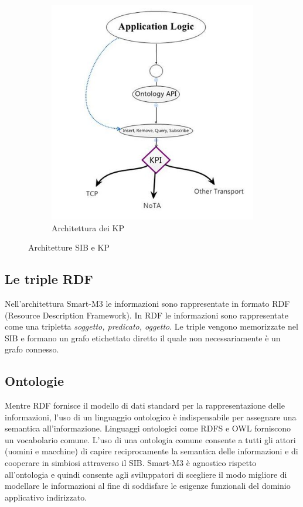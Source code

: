 \begin{figure}[H]
\begin{subfigure}[H]{0.42\textwidth}
                \includegraphics[width=\textwidth]{assets/kp-architecture.jpg}
                \caption{Architettura dei KP}
                \label{fig:kp-architecture}
        \end{subfigure}
        \caption{Architetture SIB e KP}
\end{figure}

\subsection{Le triple RDF}

Nell'architettura Smart-M3 le informazioni sono rappresentate in formato RDF (Resource Description Framework). In RDF le informazioni sono rappresentate come una tripletta \emph{soggetto, predicato, oggetto}. Le triple vengono memorizzate nel SIB e formano un grafo etichettato diretto il quale non necessariamente è un grafo connesso.

\subsection{Ontologie}

Mentre RDF fornisce il modello di dati standard per la rappresentazione delle informazioni, l'uso di un linguaggio ontologico è indispensabile per assegnare una semantica all'informazione. Linguaggi ontologici come RDFS e OWL forniscono un vocabolario comune. L'uso di una ontologia comune consente a tutti gli attori (uomini e macchine) di capire reciprocamente la semantica delle informazioni e di cooperare in simbiosi attraverso il SIB. Smart-M3 è agnostico rispetto all'ontologia e quindi consente agli sviluppatori di scegliere il modo migliore di modellare le informazioni al fine di soddisfare le esigenze funzionali del dominio applicativo indirizzato.

